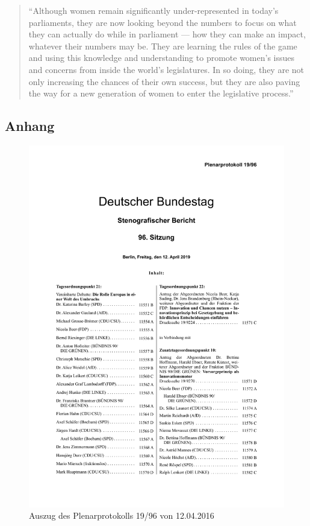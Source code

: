 \documentclass[12pt, 
    twoside=false, 
    bibliography=totoc, 
    numbers=endperiod, 
    headings=normal, 
    toc=chapterentrydotfill
    ]{scrbook}
\begin{document}
\begin{quote}
    \enquote{Although women remain significantly under-represented in today’s parliaments, they are now looking beyond the numbers to focus on what they can actually do while in parliament — how they can make an impact, whatever their numbers may be. They are learning the rules of the game and using this knowledge and understanding to promote women’s issues and concerns from inside the world’s legislatures. In so doing, they are not only increasing the chances of their own success, but they are also paving the way for a new generation of women to enter the legislative process.} \parencite[3]{lovenduski_2015}
\end{quote}



\begin{appendices}
\chapter{Anhang}

\begin{figure}[H]
    \centering
    \includegraphics[page=14,scale=0.7]{images/protokoll_beispiel.pdf}
    \caption{Auszug des Plenarprotokolls 19/96 von 12.04.2016}
    \label{fig:protokoll_bsp}
\end{figure}



\end{appendices}
\end{document}

